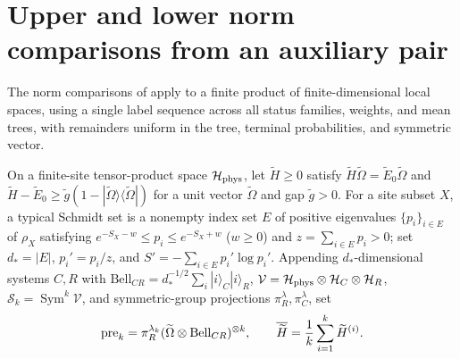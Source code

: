 \section{Upper and lower norm comparisons from an auxiliary pair}
\label{sec:al_comparators_source}

The norm comparisons of \cite[Proposition~8.1]{OpenAI2026AreaLaw} apply to a finite product of finite-dimensional local spaces, using a single label sequence across all status families, weights, and mean trees, with remainders uniform in the tree, terminal probabilities, and symmetric vector.

\begin{definition}
    \label{def:al_comparators_source_statement}
    \leanok
    On a finite-site tensor-product space $\mathcal H_{\rm phys}$, let $\widetilde H\ge0$ satisfy $\widetilde H\widetilde\Omega=\widetilde E_0\widetilde\Omega$ and $\widetilde H-\widetilde E_0\ge\widetilde g(1-|\widetilde\Omega\rangle\langle\widetilde\Omega|)$ for a unit vector $\widetilde\Omega$ and gap $\widetilde g>0$.
    For a site subset $X$, a typical Schmidt set is a nonempty index set $E$ of positive eigenvalues $\{p_i\}_{i\in E}$ of $\rho_X$ satisfying $e^{-S_X-w}\le p_i\le e^{-S_X+w}$ ($w\ge0$) and $z=\sum_{i\in E}p_i>0$; set $d_*=|E|$, $p_i'=p_i/z$, and $S'=-\sum_{i\in E}p_i'\log p_i'$.
    Appending $d_*$-dimensional systems $C,R$ with $\mathrm{Bell}_{CR}=d_*^{-1/2}\sum_i|i\rangle_C|i\rangle_R$, $\mathcal V=\mathcal H_{\rm phys}\otimes\mathcal H_C\otimes\mathcal H_R$, $\mathcal S_k=\operatorname{Sym}^k\mathcal V$, and symmetric-group projections $\pi^\lambda_R,\pi^\lambda_C$, set
    \begin{align}
        \mathrm{pre}_k=\pi_R^{\lambda_k}
        (\widetilde\Omega\otimes\mathrm{Bell}_{CR})^{\otimes k},
        \qquad
        \overline{\widetilde H}=\frac1k\sum_{i=1}^k\widetilde H^{(i)}.\notag
    \end{align}


\end{definition}
